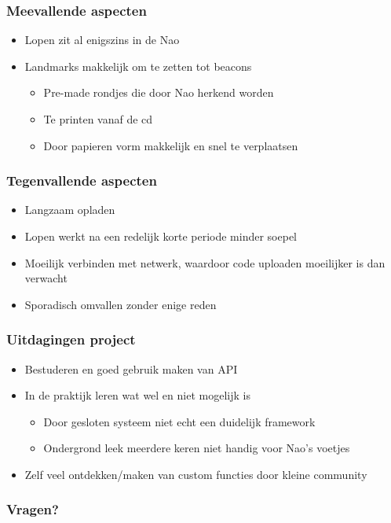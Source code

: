 \documentclass[]{beamerruhuisstijl}
\begin{document}
\begin{frame}
    \frametitle{Meevallende aspecten}	
\begin{itemize}
	\item Lopen zit al enigszins in de Nao
	\item Landmarks makkelijk om te zetten tot beacons
	\begin{itemize}
		\item Pre-made rondjes die door Nao herkend worden
		\item Te printen vanaf de cd
		\item Door papieren vorm makkelijk en snel te verplaatsen
	\end{itemize}
    \end{itemize}
  \end{frame}

\begin{frame}
 \frametitle{Tegenvallende aspecten}	
   \begin{itemize}
   	\item Langzaam opladen
	\item Lopen werkt na een redelijk korte periode minder soepel
	\item Moeilijk verbinden met netwerk, waardoor code uploaden moeilijker is dan verwacht
	\item Sporadisch omvallen zonder enige reden
    \end{itemize}
  \end{frame}


\begin{frame}
 \frametitle{Uitdagingen project}	
   \begin{itemize}
   	\item Bestuderen en goed gebruik maken van API
   	\item In de praktijk leren wat wel en niet mogelijk is
   	\begin{itemize}
		\item Door gesloten systeem niet echt een duidelijk framework
		\item Ondergrond leek meerdere keren niet handig voor Nao's voetjes
	\end{itemize}
	\item Zelf veel ontdekken/maken van custom functies door kleine community
    \end{itemize}
  \end{frame}
  
  \begin{frame}
    \frametitle{Vragen?}
  \end{frame}
\end{document}
